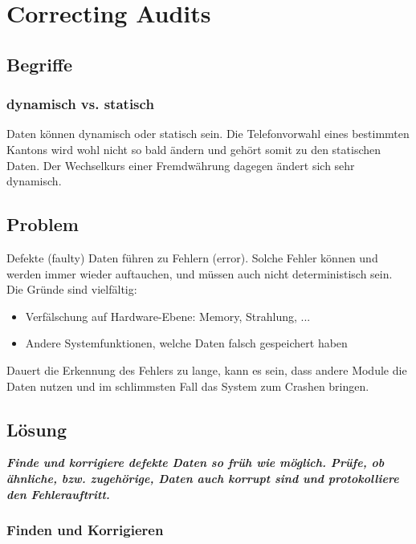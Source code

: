 \section{Correcting Audits}

\subsection{Begriffe}

\subsubsection*{dynamisch vs. statisch}

Daten können dynamisch oder statisch sein. Die Telefonvorwahl eines bestimmten Kantons wird wohl nicht so bald ändern und gehört somit zu den statischen Daten. Der Wechselkurs einer Fremdwährung dagegen ändert sich sehr dynamisch.

\subsection{Problem}

Defekte (faulty) Daten führen zu Fehlern (error). Solche Fehler können und werden immer wieder auftauchen, und müssen auch nicht deterministisch sein. Die Gründe sind vielfältig:
\begin{itemize}
	\item Verfälschung auf Hardware-Ebene: Memory, Strahlung, ...
	\item Andere Systemfunktionen, welche Daten falsch gespeichert haben
\end{itemize}


Dauert die Erkennung des Fehlers zu lange, kann es sein, dass andere Module die Daten nutzen und im schlimmsten Fall das System zum Crashen bringen.

\subsection{Lösung}

\textbf{\textit{Finde und korrigiere defekte Daten so früh wie möglich. Prüfe, ob ähnliche, bzw. zugehörige, Daten auch korrupt sind und protokolliere den Fehlerauftritt.}}

\subsubsection*{Finden und Korrigieren}

